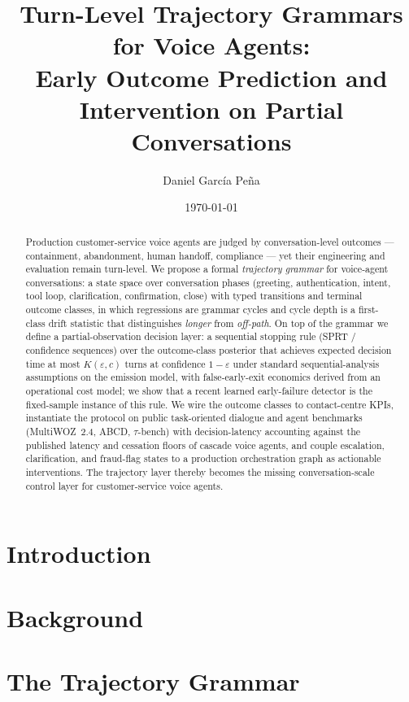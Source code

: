 \documentclass[11pt,a4paper]{article}
\title{Turn-Level Trajectory Grammars for Voice Agents:\\
Early Outcome Prediction and Intervention on Partial Conversations}
\author[1,2]{Daniel Garc\'ia Pe\~na}
\affil[1]{AI Engineering, Spain.}
\affil[2]{\texttt{info@iamdgarcia.com} --- ORCID 0000-0002-1456-4785}
\date{\today}
\begin{document}
\maketitle

\begin{abstract}
Production customer-service voice agents are judged by conversation-level outcomes ---
containment, abandonment, human handoff, compliance --- yet their engineering and evaluation
remain turn-level.
We propose a formal \emph{trajectory grammar} for voice-agent conversations: a state space over
conversation phases (greeting, authentication, intent, tool loop, clarification, confirmation,
close) with typed transitions and terminal outcome classes, in which regressions are grammar
cycles and cycle depth is a first-class drift statistic that distinguishes \emph{longer} from
\emph{off-path}.
On top of the grammar we define a partial-observation decision layer: a sequential stopping rule
(SPRT / confidence sequences) over the outcome-class posterior that achieves expected decision
time at most $K(\varepsilon, c)$ turns at confidence $1-\varepsilon$ under standard sequential-analysis assumptions on the emission model, with false-early-exit economics derived
from an operational cost model; we show that a recent learned early-failure detector is the
fixed-sample instance of this rule.
We wire the outcome classes to contact-centre KPIs, instantiate the protocol on public
task-oriented dialogue and agent benchmarks (MultiWOZ~2.4, ABCD, $\tau$-bench) with
decision-latency accounting against the
published latency and cessation floors of cascade voice agents, and couple escalation,
clarification, and fraud-flag states to a production orchestration graph as actionable
interventions.
The trajectory layer thereby becomes the missing conversation-scale control layer for customer-service
voice agents.
\end{abstract}

\section{Introduction}
\label{sec:introduction}


\section{Background}
\label{sec:background}


\section{The Trajectory Grammar}
\label{sec:grammar}

\end{document}
